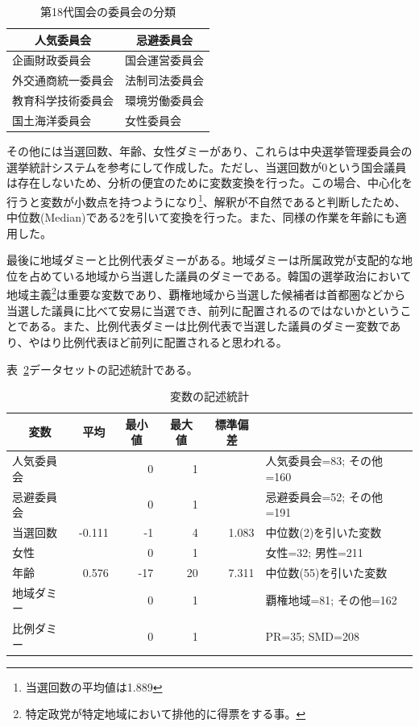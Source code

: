 \documentclass[12pt, a4j]{jsarticle}
\begin{document}
\begin{table}
	\centering
	\caption{第18代国会の委員会の分類} \label{tab:委員会}
	\begin{tabular}{ll}
		\toprule
		\multicolumn{1}{c}{人気委員会} & \multicolumn{1}{c}{忌避委員会} \\
		\midrule
		企画財政委員会 & 国会運営委員会 \\
		外交通商統一委員会 & 法制司法委員会 \\
		教育科学技術委員会 & 環境労働委員会 \\
		国土海洋委員会 & 女性委員会 \\
		\bottomrule
	\end{tabular}
\end{table}

その他には当選回数、年齢、女性ダミーがあり、これらは中央選挙管理委員会の選挙統計システムを参考にして作成した。ただし、当選回数が0という国会議員は存在しないため、分析の便宜のために変数変換を行った。この場合、中心化を行うと変数が小数点を持つようになり\footnote{当選回数の平均値は1.889}、解釈が不自然であると判断したため、中位数(Median)である2を引いて変換を行った。また、同様の作業を年齢にも適用した。\par

最後に地域ダミーと比例代表ダミーがある。地域ダミーは所属政党が支配的な地位を占めている地域から当選した議員のダミーである。韓国の選挙政治において地域主義\footnote{特定政党が特定地域において排他的に得票をする事。}は重要な変数であり、覇権地域から当選した候補者は首都圏などから当選した議員に比べて安易に当選でき、前列に配置されるのではないかということである。また、比例代表ダミーは比例代表で当選した議員のダミー変数であり、やはり比例代表ほど前列に配置されると思われる。\par

表~\ref{tab:記述統計}データセットの記述統計である。\par

\begin{table}[htbp]
	\centering
	\caption{変数の記述統計} \label{tab:記述統計}
	\begin{tabular}{lrrrrl}
		\toprule
		\multicolumn{1}{c}{変数} & \multicolumn{1}{c}{平均} & \multicolumn{1}{c}{最小値}& \multicolumn{1}{c}{最大値}& \multicolumn{1}{c}{標準偏差}& \multicolumn{1}{c}{}\\
		\midrule
		人気委員会 & & 0 & 1 & & 人気委員会=83; その他=160 \\
		忌避委員会 & & 0 & 1 & & 忌避委員会=52; その他=191 \\
		当選回数 & -0.111 & -1 & 4 & 1.083 & 中位数(2)を引いた変数\\
		女性 & & 0 & 1 & & 女性=32; 男性=211\\
		年齢 &  0.576 & -17 & 20 & 7.311  & 中位数(55)を引いた変数\\
		地域ダミー & & 0 & 1 & & 覇権地域=81; その他=162\\
		比例ダミー & & 0 & 1 & & PR=35; SMD=208\\
		\bottomrule
	\end{tabular}
\end{table}
\end{document}
